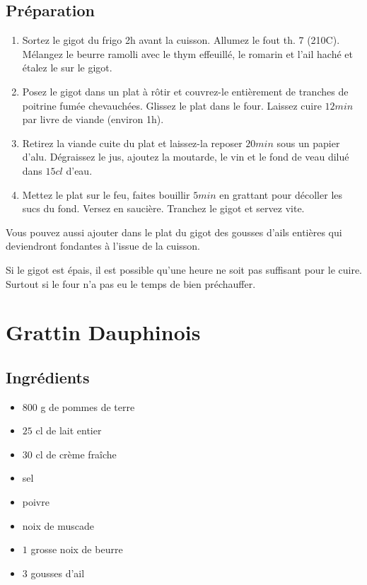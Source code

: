 \subsection*{Préparation}
\begin{enumerate}
\item Sortez le gigot du frigo 2h avant la cuisson. Allumez le fout th. 7 (210\degres C). Mélangez le beurre ramolli avec le thym effeuillé, le romarin et l'ail haché et étalez le sur le gigot.
\item Posez le gigot dans un plat à rôtir et couvrez-le entièrement de tranches de poitrine fumée chevauchées. Glissez le plat dans le four. Laissez cuire $12\unit{min}$ par livre de viande (environ 1h).
\item Retirez la viande cuite du plat et laissez-la reposer $20\unit{min}$ sous un papier d'alu. Dégraissez le jus, ajoutez la moutarde, le vin et le fond de veau dilué dans $15\unit{cl}$ d'eau.
\item Mettez le plat sur le feu, faites bouillir $5\unit{min}$ en grattant pour décoller les sucs du fond. Versez en saucière. Tranchez le gigot et servez vite.
\end{enumerate}

\begin{remarque}
Vous pouvez aussi ajouter dans le plat du gigot des gousses d'ails entières qui deviendront fondantes à l'issue de la cuisson.

Si le gigot est épais, il est possible qu'une heure ne soit pas suffisant pour le cuire. Surtout si le four n'a pas eu le temps de bien préchauffer.
\end{remarque}




\newpage
\section{Grattin Dauphinois}
\subsection*{Ingrédients}
\begin{itemize}
\item $800$ g de pommes de terre
\item $25$ cl de lait entier
\item $30$ cl de crème fraîche
\item sel
\item poivre
\item noix de muscade
\item $1$ grosse noix de beurre
\item $3$ gousses d'ail
\end{itemize}

